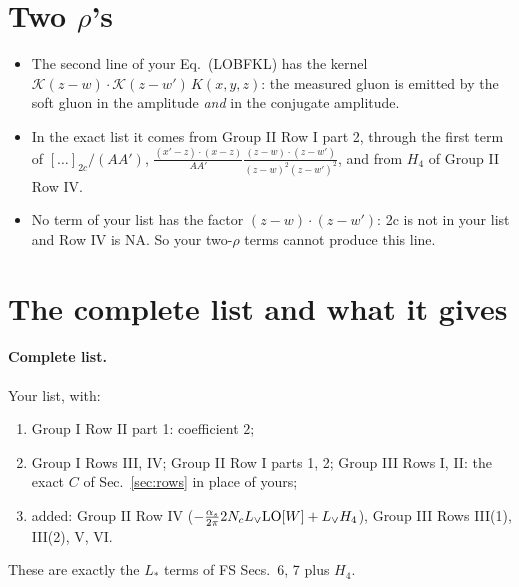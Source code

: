 \documentclass[10pt]{article}
\numberwithin{equation}{section}
\newcommand{\Lv}{L_{\vee}}
\newcommand{\Ls}{L_{*}}
\newcommand{\KK}{\mathcal K}
\begin{document}
\section{Two \texorpdfstring{$\rho$}{rho}'s}\label{sec:two}
\begin{itemize}
\item The second line of your Eq.~(LOBFKL) has the kernel $\KK(z-w)\cdot\KK(z-w')\,K(x,y,z)$: the measured gluon is emitted by the soft gluon in the amplitude \emph{and} in the conjugate amplitude.
\item In the exact list it comes from Group II Row I part 2, through the first term of $[\dots]_{2c}/(AA')$, $\frac{(x'-z)\cdot(x-z)}{AA'}\frac{(z-w)\cdot(z-w')}{(z-w)^2(z-w')^2}$, and from $H_4$ of Group II Row IV.
\item No term of your list has the factor $(z-w)\cdot(z-w')$: 2c is not in your list and Row IV is NA. So your two-$\rho$ terms cannot produce this line.
\end{itemize}

\section{The complete list and what it gives}\label{sec:complete}
\paragraph{Complete list.} Your list, with:
\begin{enumerate}
\item Group I Row II part 1: coefficient $2$;
\item Group I Rows III, IV; Group II Row I parts 1, 2; Group III Rows I, II: the exact $C$ of Sec.~\ref{sec:rows} in place of yours;
\item added: Group II Row IV ($-\frac{\alpha_s}{2\pi}2N_c\Lv{\rm LO}[W]+\Lv H_4$), Group III Rows III(1), III(2), V, VI.
\end{enumerate}
These are exactly the $\Ls$ terms of FS Secs.~6, 7 plus $H_4$.
\end{document}
